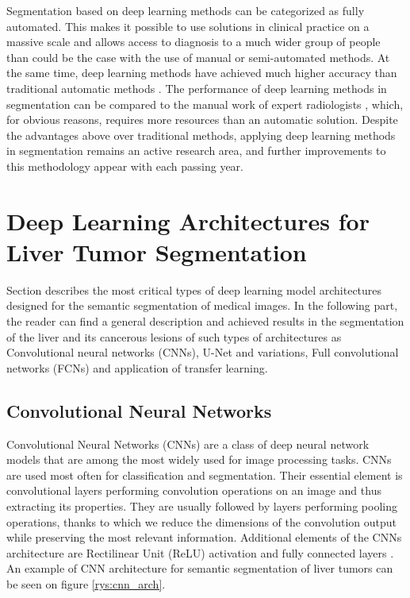 Segmentation based on deep learning methods can be categorized as fully automated. This makes it possible to use solutions in clinical practice on a massive scale and allows access to diagnosis to a much wider group of people than could be the case with the use of manual or semi-automated methods. At the same time, deep learning methods have achieved much higher accuracy than traditional automatic methods \cite{liu_review_2021}. The performance of deep learning methods in segmentation can be compared to the manual work of expert radiologists \cite{hirsch_radiologist-level_2022}, which, for obvious reasons, requires more resources than an automatic solution. Despite the advantages above over traditional methods, applying deep learning methods in segmentation remains an active research area, and further improvements to this methodology appear with each passing year.



\section{Deep Learning Architectures for Liver Tumor Segmentation}

Section describes the most critical types of deep learning model architectures designed for the semantic segmentation of medical images. In the following part, the reader can find a general description and achieved results in the segmentation of the liver and its cancerous lesions of such types of architectures as Convolutional neural networks (CNNs), U-Net and variations, Full convolutional networks (FCNs) and application of transfer learning.

\subsection{Convolutional Neural Networks}

Convolutional Neural Networks (CNNs) are a class of deep neural network models that are among the most widely used for image processing tasks. CNNs are used most often for classification and segmentation. Their essential element is convolutional layers performing convolution operations on an image and thus extracting its properties. They are usually followed by layers performing pooling operations, thanks to which we reduce the dimensions of the convolution output while preserving the most relevant information. Additional elements of the CNNs architecture are Rectilinear Unit (ReLU) activation and fully connected layers \cite{oshea_introduction_2015}. An example of CNN architecture for semantic segmentation of liver tumors can be seen on figure \ref{rys:cnn_arch}.

